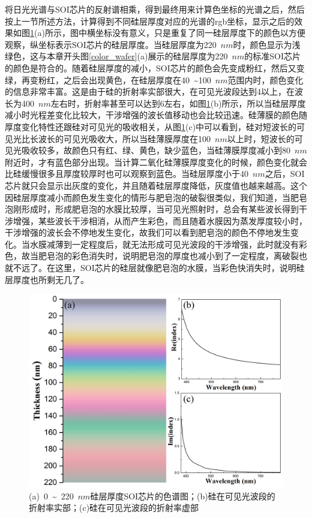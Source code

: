 将日光光谱与SOI芯片的反射谱相乘，得到最终用来计算色坐标的光谱之后，然后按上一节所述方法，计算得到不同硅层厚度对应的光谱的rgb坐标，显示之后的效果如图\ref{color_220nm}(a)所示，图中横坐标没有意义，只是重复了同一硅层厚度下的颜色以方便观察，纵坐标表示SOI芯片的硅层厚度。当硅层厚度为220~$nm$时，颜色显示为浅绿色，这与本章开头图\ref{color_wafer}(a)展示的硅层厚度为220~$nm$的标准SOI芯片的颜色是符合的。随着硅层厚度的减小，SOI芯片的颜色会先变成粉红，然后又变绿，再变粉红，之后会出现黄色，在硅层厚度在40~\~{}100~$nm$范围内时，颜色变化的信息非常丰富。这是由于硅的折射率实部很大，在可见光波段达到4以上，在波长为400~$nm$左右时，折射率甚至可以达到6左右，如图\ref{color_220nm}(b)所示，所以当硅层厚度减小时光程差变化比较大，干涉增强的波长值移动也会比较迅速。硅薄膜的颜色随厚度变化特性还跟硅对可见光的吸收相关，从图\ref{color_220nm}(c)中可以看到，硅对短波长的可见光比长波长的可见光吸收大，所以当硅薄膜厚度在100~$nm$以上时，短波长的可见光吸收较多，故颜色只有红、绿、黄色，缺少蓝色，当硅薄膜厚度减小到80~$nm$附近时，才有蓝色部分出现。当计算二氧化硅薄膜厚度变化的时候，颜色变化就会比硅缓慢很多且厚度较厚时也可以观察到蓝色。当硅层厚度小于40~$nm$之后，SOI芯片就只会显示出灰度的变化，并且随着硅层厚度降低，灰度值也越来越高。这个因硅层厚度减小而颜色发生变化的情形与肥皂泡的破裂很类似，我们知道，当肥皂泡刚形成时，形成肥皂泡的水膜比较厚，当可见光照射时，总会有某些波长得到干涉增强，某些波长干涉相消，从而产生彩色，而且随着水膜因为蒸发厚度较小时，干涉增强的波长会不停地发生变化，故我们可以看到肥皂泡的颜色不停地发生变化。当水膜减薄到一定程度后，就无法形成可见光波段的干涉增强，此时就没有彩色，故当肥皂泡的彩色消失时，说明肥皂泡的厚度也减小到了一定程度，离破裂也就不远了。在这里，SOI芯片的硅层就像肥皂泡的水膜，当彩色快消失时，说明硅层厚度也所剩无几了。

\begin{figure}[htb]
	\centering
	\includegraphics[width=14cm]{./Pictures/color_220nm.jpg}
	\captionsetup{justification=centering}
	\caption{(a)~0~\~{}~220~$nm$硅层厚度SOI芯片的色谱图；(b)硅在可见光波段的折射率实部；(c)硅在可见光波段的折射率虚部\cite{aspnes1983dielectric}}
	\label{color_220nm}
\end{figure}

